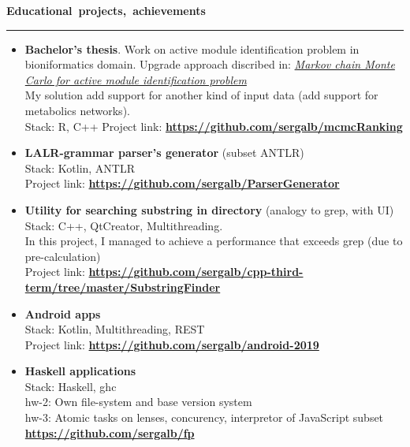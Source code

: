 \documentclass[10pt, a4paper]{report}
\begin{document}
    \par\hbox{\large\textbf{Educational projects, achievements}}\kern5pt\hrule\kern5pt
    \begin{itemize}

        \item \textbf{Bachelor's thesis}. Work on active module identification problem in bioniformatics domain. Upgrade approach discribed in: \href{https://bmcbioinformatics.biomedcentral.com/articles/10.1186/s12859-020-03572-9}{\textit{Markov chain Monte Carlo for active module identification problem}}\\
        My solution add support for another kind of input data (add support for metabolics networks).\\
        Stack: R, C++
        Project link:
        \textbf{
        \url{https://github.com/sergalb/mcmcRanking}
        }


        \item \textbf{LALR-grammar parser's generator} (subset ANTLR)\\
        Stack: Kotlin, ANTLR\\
        Project link:
        \textbf{
        \url{https://github.com/sergalb/ParserGenerator}
        }

        \item \textbf{Utility for searching substring in directory} (analogy to grep, with UI)\\
        Stack: C++, QtCreator, Multithreading.\\
        In this project, I managed to achieve a performance that exceeds grep (due to pre-calculation)\\
        Project link:
        \textbf{
        \url{https://github.com/sergalb/cpp-third-term/tree/master/SubstringFinder}
        }

        \item \textbf{Android apps}\\
        Stack: Kotlin, Multithreading, REST\\
        Project link:
        \textbf{
        \url{https://github.com/sergalb/android-2019}
        }

        \item \textbf{Haskell applications}\\
        Stack: Haskell, ghc \\
        hw-2: Own file-system and base version system\\
        hw-3: Atomic tasks on lenses, concurency, interpretor of JavaScript subset\\
        \textbf{
        \url{https://github.com/sergalb/fp}
        }


\end{itemize}
\end{document}
